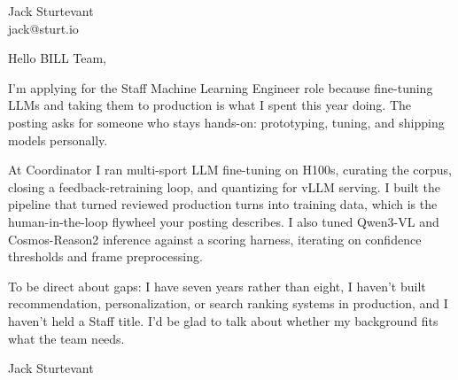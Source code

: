 \documentclass[11pt]{article}
\begin{document}
\raggedright

{\namefont\fontsize{20pt}{24pt}\selectfont Jack Sturtevant}\\[-0.3em]
jack@sturt.io

\vspace{1.2em}

Hello BILL Team,

I'm applying for the Staff Machine Learning Engineer role because fine-tuning LLMs and taking them to production is what I spent this year doing. The posting asks for someone who stays hands-on: prototyping, tuning, and shipping models personally.

At Coordinator I ran multi-sport LLM fine-tuning on H100s, curating the corpus, closing a feedback-retraining loop, and quantizing for vLLM serving. I built the pipeline that turned reviewed production turns into training data, which is the human-in-the-loop flywheel your posting describes. I also tuned Qwen3-VL and Cosmos-Reason2 inference against a scoring harness, iterating on confidence thresholds and frame preprocessing.

To be direct about gaps: I have seven years rather than eight, I haven't built recommendation, personalization, or search ranking systems in production, and I haven't held a Staff title. I'd be glad to talk about whether my background fits what the team needs.

\vspace{0.6em}
Jack Sturtevant
\end{document}
